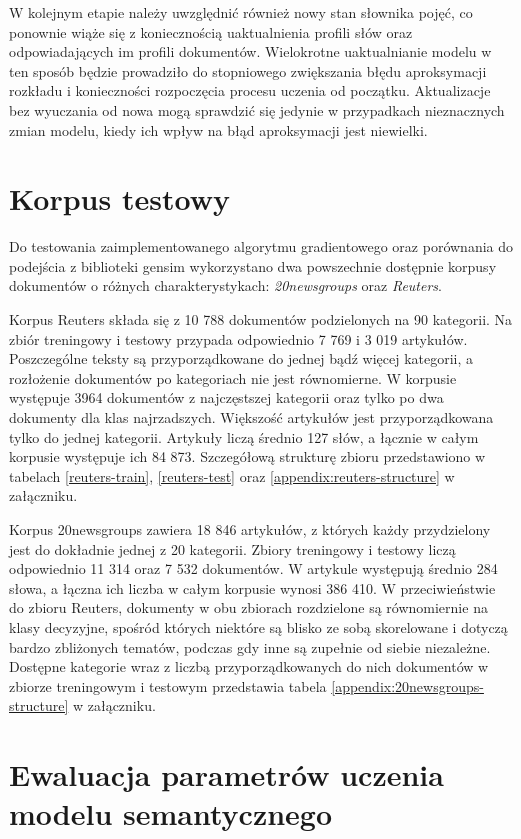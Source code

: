 \documentclass{pracamgr}
\begin{document}
W kolejnym etapie należy uwzględnić również nowy stan słownika pojęć, co ponownie wiąże się z koniecznością uaktualnienia profili słów oraz odpowiadających im profili dokumentów. Wielokrotne uaktualnianie modelu w ten sposób będzie prowadziło do stopniowego zwiększania błędu aproksymacji rozkładu i konieczności rozpoczęcia procesu uczenia od początku. Aktualizacje bez wyuczania od nowa mogą sprawdzić się jedynie w przypadkach nieznacznych zmian modelu, kiedy ich wpływ na błąd aproksymacji jest niewielki.

\section{Korpus testowy}
Do testowania zaimplementowanego algorytmu gradientowego oraz porównania do podejścia z biblioteki gensim wykorzystano dwa powszechnie dostępnie korpusy dokumentów o różnych charakterystykach: \textit{20newsgroups} oraz \textit{Reuters}.

Korpus Reuters składa się z 10 788 dokumentów podzielonych na 90 kategorii. Na zbiór treningowy i testowy przypada odpowiednio 7 769 i 3 019 artykułów. Poszczególne teksty są przyporządkowane do jednej bądź więcej kategorii, a rozłożenie dokumentów po kategoriach nie jest równomierne. W korpusie występuje 3964 dokumentów z najczęstszej kategorii oraz tylko po dwa dokumenty dla klas najrzadszych. Większość artykułów jest przyporządkowana tylko do jednej kategorii. Artykuły liczą średnio 127 słów, a łącznie w całym korpusie występuje ich 84 873. Szczegółową strukturę zbioru przedstawiono w tabelach \ref{reuters-train}, \ref{reuters-test} oraz \ref{appendix:reuters-structure} w załączniku. 

Korpus 20newsgroups zawiera 18 846 artykułów, z których każdy przydzielony jest do dokładnie jednej z 20 kategorii. Zbiory treningowy i testowy liczą odpowiednio 11 314 oraz 7 532 dokumentów. W artykule występują średnio 284 słowa, a łączna ich liczba w całym korpusie wynosi 386 410. W przeciwieństwie do zbioru Reuters, dokumenty w obu zbiorach rozdzielone są równomiernie na klasy decyzyjne, spośród których niektóre są blisko ze sobą skorelowane i dotyczą bardzo zbliżonych tematów, podczas gdy inne są zupełnie od siebie niezależne. Dostępne kategorie wraz z liczbą przyporządkowanych do nich dokumentów w zbiorze treningowym i testowym przedstawia tabela \ref{appendix:20newsgroups-structure} w załączniku.

\section{Ewaluacja parametrów uczenia modelu semantycznego}
\end{document}
